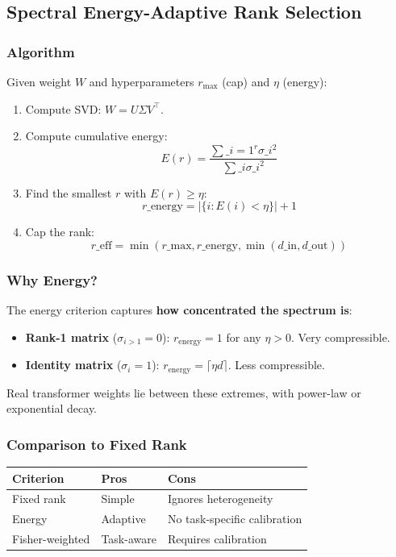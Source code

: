 \subsection{Spectral Energy-Adaptive Rank Selection}

\subsubsection{Algorithm}

Given weight $W$ and hyperparameters $r_\text{max}$ (cap) and $\eta$ (energy):

\begin{enumerate}
\item Compute SVD: $W = U \Sigma V^\top$.
\item Compute cumulative energy:
  $$
  E(r) = \frac{\sum\_{i=1}^{r} \sigma\_i^2}{\sum\_i \sigma\_i^2}
  \tag{4.3}
  $$
\item Find the smallest $r$ with $E(r) \geq \eta$:
  $$
  r\_\text{energy} = \left|\{i : E(i) < \eta\}\right| + 1
  \tag{4.4}
  $$
\item Cap the rank:
  $$
  r\_\text{eff} = \min(r\_\text{max}, r\_\text{energy}, \min(d\_\text{in}, d\_\text{out}))
  \tag{4.5}
  $$

\end{enumerate}
\subsubsection{Why Energy?}

The energy criterion captures \textbf{how concentrated the spectrum is}:

\begin{itemize}
\item \textbf{Rank-1 matrix} ($\sigma_{i>1} = 0$): $r_\text{energy} = 1$ for any
  $\eta > 0$. Very compressible.
\item \textbf{Identity matrix} ($\sigma_i = 1$): $r_\text{energy} = \lceil \eta d \rceil$.
  Less compressible.

\end{itemize}
Real transformer weights lie between these extremes, with power-law or 
exponential decay.

\subsubsection{Comparison to Fixed Rank}

\begin{table}[H]
\centering
\small
\begin{tabular}{lll}
\toprule
\textbf{Criterion} & \textbf{Pros} & \textbf{Cons} \\
\midrule
Fixed rank & Simple & Ignores heterogeneity \\
Energy & Adaptive & No task-specific calibration \\
Fisher-weighted & Task-aware & Requires calibration \\
\bottomrule
\end{tabular}
\end{table}

